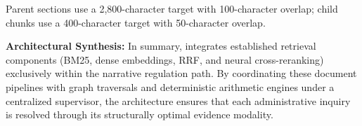 Parent sections use a 2,800-character target with 100-character overlap;
child chunks use a 400-character target with 50-character overlap.

\textbf{Architectural Synthesis:} In summary, \system{} integrates established retrieval components (BM25, dense embeddings, RRF, and neural cross-reranking) exclusively within the narrative regulation path. By coordinating these document pipelines with graph traversals and deterministic arithmetic engines under a centralized supervisor, the architecture ensures that each administrative inquiry is resolved through its structurally optimal evidence modality.
